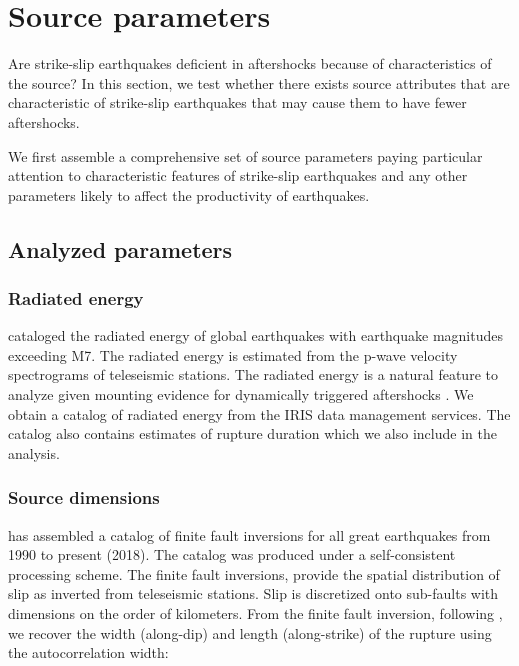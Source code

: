\documentclass[12pt, notitlepage]{report}
\begin{document}
\section{Source parameters}\label{sec:source_parameters}

Are strike-slip earthquakes deficient in aftershocks because of characteristics of the source? In this section, we test whether there exists source attributes that are characteristic of strike-slip earthquakes that may cause them to have fewer aftershocks. 

We first assemble a comprehensive set of source parameters paying particular attention to characteristic features of strike-slip earthquakes and any other parameters likely to affect the productivity of earthquakes.

\subsection{Analyzed parameters}

\subsubsection{Radiated energy}
\textcite{Convers2011GlobalMid2010} cataloged the radiated energy of global earthquakes with earthquake magnitudes exceeding M7. The radiated energy is estimated from the p-wave velocity spectrograms of teleseismic stations. The radiated energy is a natural feature to analyze given mounting evidence for dynamically triggered aftershocks \cite{Brodsky2011TheForeshocks,felzer2006decay}. We obtain a catalog of radiated energy from the IRIS data management services. The catalog also contains estimates of rupture duration which we also include in the analysis.

\subsubsection{Source dimensions}
\textcite{Hayes2017} has assembled a catalog of finite fault inversions for all great earthquakes from 1990 to present (2018). The catalog was produced under a self-consistent processing scheme. The finite fault inversions, provide the spatial distribution of slip as inverted from teleseismic stations. Slip is discretized onto sub-faults with dimensions on the order of kilometers. From the finite fault inversion, following \textcite{MartinMai2000}, we recover the width (along-dip) and length (along-strike) of the rupture using the autocorrelation width:
\end{document}
